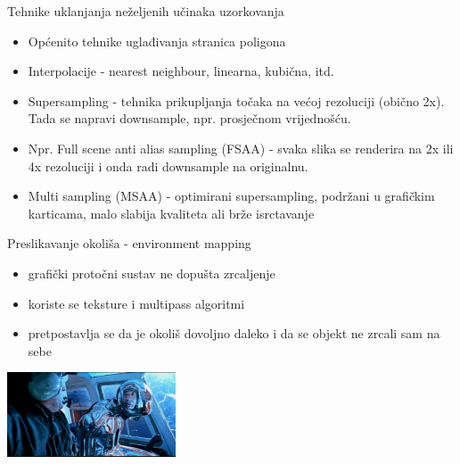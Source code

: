 \documentclass[9pt]{beamer}
\begin{document}
\begin{frame}{Tehnike uklanjanja neželjenih učinaka uzorkovanja}
	\begin{block}{}
		\begin{itemize}      
			\item Općenito tehnike uglađivanja stranica poligona
			\item Interpolacije - nearest neighbour, linearna, kubična, itd.
			\item Supersampling - tehnika prikupljanja točaka na većoj rezoluciji (obično 2x). Tada se napravi downsample, npr. prosječnom vrijednošću.
			\item Npr. Full scene anti alias sampling (FSAA) - svaka slika se renderira na 2x ili 4x rezoluciji i onda radi downsample na originalnu. 
			\item Multi sampling (MSAA) - optimirani supersampling, podržani u grafičkim karticama, malo slabija kvaliteta ali brže isrctavanje
		\end{itemize}
	\end{block}
\end{frame}
%
\begin{frame}{Preslikavanje okoliša - environment mapping}
	\begin{block}{}
		\begin{itemize}
			\item grafički protočni sustav ne dopušta zrcaljenje
			\item koriste se teksture i multipass algoritmi
			\item pretpostavlja se da je okoliš dovoljno daleko i da se objekt ne zrcali sam na sebe
		\end{itemize}
	\end{block}
	\begin{center}
		\includegraphics[width=5cm]{slike/terminator_2.png}
	\end{center}
\end{frame}
\end{document}
